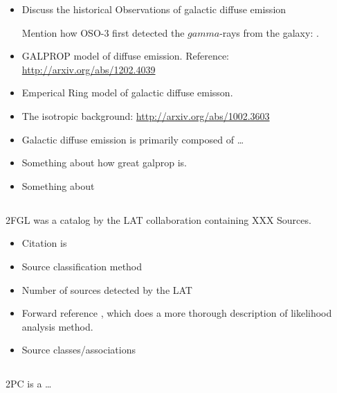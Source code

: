 \begin{itemize}
  \item Discuss the historical Observations of galactic diffuse emission

    Mention how \ac{OSO-3} first detected the $gamma$-rays from the galaxy: .

  \item GALPROP model of diffuse emission.
  Reference: \url{http://arxiv.org/abs/1202.4039}
  \item Emperical Ring model of galactic diffuse emisson.
  \item The isotropic background: \url{http://arxiv.org/abs/1002.3603}
\end{itemize}

\begin{itemize}
  \item Galactic diffuse emission is primarily composed of \ldots
  \item Something about how great galprop is.
  \item Something about
\end{itemize}


\subsection{}

\Ac{2FGL} was a catalog by the \ac{LAT} collaboration containing XXX Sources.

\begin{itemize}
  \item Citation is \cite{nolan_2012_fermi-large}
  \item Source classification method
  \item Number of sources detected by the \ac{LAT}
  \item Forward reference ,
    which does a more thorough description of likelihood analysis method.
  \item Source classes/associations
\end{itemize}

\subsection{}
\subseclabel{2pc}

\Ac{2PC} is a \ldots
{}

